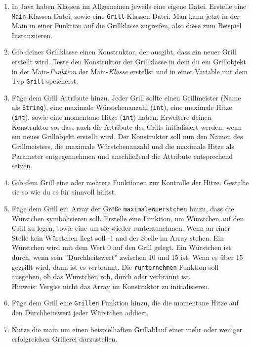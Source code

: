 \documentclass{../../sheet}
\begin{document}
\begin{enumerate}
    \item In Java haben Klassen im Allgemeinen jeweils eine eigene Datei. Erstelle eine \texttt{Main}-Klassen-Datei, sowie eine \texttt{Grill}-Klassen-Datei. Man kann jetzt in der Main in einer Funktion auf die Grillklasse zugreifen, also diese zum Beispiel Instanziieren.
    \item Gib deiner Grillklasse einen Konstruktor, der ausgibt, dass ein neuer Grill erstellt wird. Teste den Konstruktor der Grillklasse in dem du ein Grillobjekt in der Main-\textit{Funktion} der Main-\textit{Klasse} erstellst und in einer Variable mit dem Typ \texttt{Grill} speicherst.
    \item Füge dem Grill Attribute hinzu. Jeder Grill sollte einen Grillmeister (Name als \texttt{String}), eine maximale Würstchenanzahl (\texttt{int}), eine maximale Hitze (\texttt{int}), sowie eine momentane Hitze (\texttt{int}) haben. Erweitere deinen Konstruktor so, dass auch die Attribute des Grills initialisiert werden, wenn ein neues Grillobjekt erstellt wird. Der Konstruktor soll nun den Namen des Grillmeisters, die maximale Würstchenanzahl und die maximale Hitze als Parameter entgegennehmen und anschließend die Attribute entsprechend setzen.
    \item Gib dem Grill eine oder mehrere Funktionen zur Kontrolle der Hitze. Gestalte sie so wie du es für sinnvoll hältst.
    \item Füge dem Grill ein Array der Größe \texttt{maximaleWuerstchen} hinzu, dass die Würstchen symbolisieren soll. Erstelle eine Funktion, um Würstchen auf den Grill zu legen, sowie eine um sie wieder runterzunehmen. Wenn an einer Stelle kein Würstchen liegt soll -1 and der Stelle im Array stehen. Ein Würstchen wird mit dem Wert 0 auf den Grill gelegt. Ein Würstchen ist durch, wenn sein ''Durchheitswert'' zwischen 10 und 15 ist. Wenn es über 15 gegrillt wird, dann ist es verbrannt. Die \texttt{runternehmen}-Funktion soll ausgeben, ob das Würstchen roh, durch oder verbrannt ist.\\
    Hinweis: Vergiss nicht das Array im Konstruktor zu initialisieren.
    \item Füge dem Grill eine \texttt{Grillen} Funktion hinzu, die die momentane Hitze auf den Durchheitswert jeder Würstchen addiert.
    \item Nutze die main um einen beispielhaften Grillablauf einer mehr oder weniger erfolgreichen Grillerei darzustellen. 
\end{enumerate}
\end{document}
